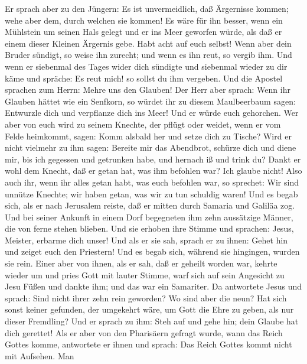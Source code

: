  Er sprach aber zu den Jüngern: Es ist unvermeidlich, daß
Ärgernisse kommen; wehe aber dem, durch welchen sie kommen!
 Es wäre für ihn besser, wenn ein Mühlstein um seinen Hals
gelegt und er ins Meer geworfen würde, als daß er einem dieser Kleinen
Ärgernis gebe.  Habt acht auf euch selbst! Wenn aber dein
Bruder sündigt, so weise ihn zurecht; und wenn es ihn reut, so vergib
ihm.  Und wenn er siebenmal des Tages wider dich sündigte
und siebenmal wieder zu dir käme und spräche: Es reut mich! so sollst du
ihm vergeben.  Und die Apostel sprachen zum Herrn: Mehre
uns den Glauben!  Der Herr aber sprach: Wenn ihr Glauben
hättet wie ein Senfkorn, so würdet ihr zu diesem Maulbeerbaum sagen:
Entwurzle dich und verpflanze dich ins Meer! Und er würde euch
gehorchen.  Wer aber von euch wird zu seinem Knechte, der
pflügt oder weidet, wenn er vom Felde heimkommt, sagen: Komm alsbald her
und setze dich zu Tische?  Wird er nicht vielmehr zu ihm
sagen: Bereite mir das Abendbrot, schürze dich und diene mir, bis ich
gegessen und getrunken habe, und hernach iß und trink du? 
Dankt er wohl dem Knecht, daß er getan hat, was ihm befohlen war? Ich
glaube nicht!  Also auch ihr, wenn ihr alles getan habt,
was euch befohlen war, so sprechet: Wir sind unnütze Knechte; wir haben
getan, was wir zu tun schuldig waren!  Und es begab sich,
als er nach Jerusalem reiste, daß er mitten durch Samaria und Galiläa
zog.  Und bei seiner Ankunft in einem Dorf begegneten ihm
zehn aussätzige Männer, die von ferne stehen blieben. 
Und sie erhoben ihre Stimme und sprachen: Jesus, Meister, erbarme dich
unser!  Und als er sie sah, sprach er zu ihnen: Gehet hin
und zeiget euch den Priestern! Und es begab sich, während sie hingingen,
wurden sie rein.  Einer aber von ihnen, als er sah, daß
er geheilt worden war, kehrte wieder um und pries Gott mit lauter
Stimme,  warf sich auf sein Angesicht zu Jesu Füßen und
dankte ihm; und das war ein Samariter.  Da antwortete
Jesus und sprach: Sind nicht ihrer zehn rein geworden? Wo sind aber die
neun?  Hat sich sonst keiner gefunden, der umgekehrt
wäre, um Gott die Ehre zu geben, als nur dieser Fremdling?
 Und er sprach zu ihm: Steh auf und gehe hin; dein Glaube
hat dich gerettet!  Als er aber von den Pharisäern
gefragt wurde, wann das Reich Gottes komme, antwortete er ihnen und
sprach: Das Reich Gottes kommt nicht mit Aufsehen.  Man
